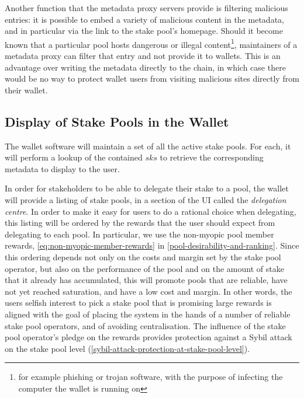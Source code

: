 \documentclass[11pt,a4paper]{article}
\begin{document}
Another function that the metadata proxy servers provide is filtering malicious
entries: it is possible to embed a variety of malicious content in the metadata,
and in particular via the link to the stake pool's homepage. Should it become
known that a particular pool hosts dangerous or illegal
content\footnote{for example phishing or trojan software, with the purpose of
  infecting the computer the wallet is running on}, maintainers of
a metadata proxy can filter that entry and not provide it to wallets. This is an
advantage over writing the metadata directly to the chain, in which case there
would be no way to protect wallet users from visiting malicious sites directly
from their wallet.

\subsection{Display of Stake Pools in the Wallet}
\label{display-of-stake-pools-in-the-wallet}

The wallet software will maintain a set of all the active stake pools. For each,
it will perform a lookup of the contained \(sks\) to retrieve the corresponding
metadata to display to the user.

In order for stakeholders to be able to delegate their stake to a pool, the
wallet will provide a listing of stake pools, in a section of the UI called the
\emph{delegation centre}. In order to make it easy for users to do a rational
choice when delegating, this listing will be ordered by the rewards that the
user should expect from delegating to each pool. In particular, we use the
non-myopic pool member rewards, \cref{eq:non-myopic-member-rewards} in
\cref{pool-desirability-and-ranking}. Since this ordering depends not only on
the costs and margin set by the stake pool operator, but also on the performance
of the pool and on the amount of stake that it already has accumulated, this
will promote pools that are reliable, have not yet reached saturation, and have
a low cost and margin. In other words, the users selfish interest to pick a
stake pool that is promising large rewards is aligned with the goal of placing
the system in the hands of a number of reliable stake pool operators, and of
avoiding centralisation. The influence of the stake pool operator's pledge on
the rewards provides protection against a Sybil attack on the stake pool level
(\cref{sybil-attack-protection-at-stake-pool-level}).
\end{document}
